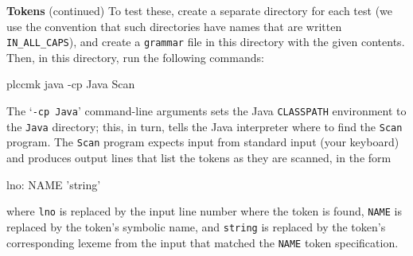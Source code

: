 \begin{minipage}[t]{\sw}
\slidenumber
\LARGE
{\bf Tokens} (continued)\exx
To test these, create a separate directory for each test
(we use the convention that such directories have names
that are written \verb'IN_ALL_CAPS'),
and create a \verb'grammar' file in this directory
with the given contents.
Then, in this directory, run the following commands:
\begin{qv}
plccmk
java -cp Java Scan
\end{qv}
The `\verb'-cp Java'' command-line arguments
sets the Java \verb'CLASSPATH' environment to the \verb'Java' directory;
this, in turn, tells the Java interpreter
where to find the \verb'Scan' program.\exx
The \verb'Scan' program expects input from standard input
(your keyboard)
and produces output lines that list the tokens as they are scanned,
in the form
\begin{qv}
lno: NAME 'string'
\end{qv}
where \verb'lno' is replaced by the input line number where the token is found,
\verb'NAME' is replaced by the token's symbolic name,
and \verb'string' is replaced by the token's corresponding lexeme
from the input that matched the \verb'NAME' token specification.
\end{minipage}
\clearpage
